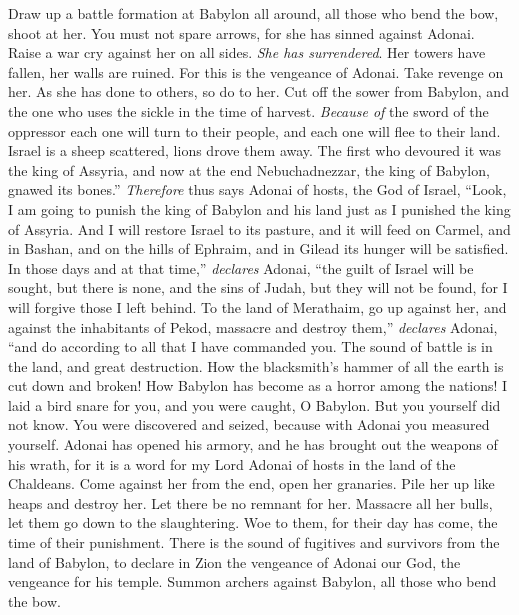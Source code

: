\begin{biblechapter}
\verse Draw up a battle formation at Babylon all around, 
all those who bend the bow, shoot at her. 
You must not spare arrows, 
for she has sinned against Adonai.
\verse Raise a war cry against her on all sides. 
\textit{She has surrendered}. 
Her towers have fallen, 
her walls are ruined. 
For this is the vengeance of Adonai. 
Take revenge on her. 
As she has done to others, 
so do to her.
\verse Cut off the sower from Babylon, 
and the one who uses the sickle in the time of harvest. 
\textit{Because of} the sword of the oppressor 
each one will turn to their people, 
and each one will flee to their land.
\verse Israel is a sheep scattered, 
lions drove them away. 
The first who devoured it was the king of Assyria, 
and now at the end Nebuchadnezzar, the king of Babylon, gnawed its bones.”
\verse \textit{Therefore} thus says Adonai of hosts, the God of Israel,
\verse “Look, I am going to punish the king of Babylon and his land 
just as I punished the king of Assyria.
\verse And I will restore Israel to its pasture, 
and it will feed on Carmel, and in Bashan, 
and on the hills of Ephraim, and in Gilead 
its hunger will be satisfied.
\verse In those days and at that time,” \textit{declares} Adonai, 
“the guilt of Israel will be sought, but there is none, 
and the sins of Judah, but they will not be found, 
for I will forgive those I left behind.
\verse To the land of Merathaim, 
go up against her, 
and against the inhabitants of Pekod, 
massacre and destroy them,” \textit{declares} Adonai, 
“and do according to all that I have commanded you.
\verse The sound of battle is in the land, 
and great destruction.
\verse How the blacksmith’s hammer of all the earth is cut down and broken! 
How Babylon has become as a horror among the nations!
\verse I laid a bird snare for you, and you were caught, O Babylon. 
But you yourself did not know. 
You were discovered and seized, 
because with Adonai you measured yourself.
\verse Adonai has opened his armory, 
and he has brought out the weapons of his wrath, 
for it is a word for my Lord Adonai of hosts 
in the land of the Chaldeans.
\verse Come against her from the end, 
open her granaries. 
Pile her up like heaps and destroy her. 
Let there be no remnant for her.
\verse Massacre all her bulls, 
let them go down to the slaughtering. 
Woe to them, for their day has come, 
the time of their punishment.
\verse There is the sound of fugitives and survivors 
from the land of Babylon, 
to declare in Zion the vengeance of Adonai our God, 
the vengeance for his temple.
\verse Summon archers against Babylon, 
all those who bend the bow. 

\end{biblechapter}
